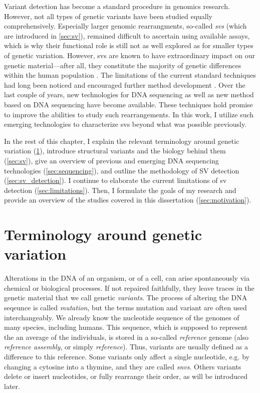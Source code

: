 Variant detection has become a standard procedure in genomics research. However,
not all types of genetic variants have been studied equally comprehensively.
Especially larger genomic rearrangments, so-called \emph{\aclp{sv}} (which are
introduced in \cref{sec:sv}), remained
difficult to ascertain using available assays, which is why their functional
role is still not as well explored as for smaller types of genetic variation.
However, \aclp{sv} are known to have extraordinary impact on our genetic
material---after all, they constitute the majority of genetic
differences within the human population \citep{Sudmant2015}.
The limitations of the current standard techniques had long been noticed and
encouraged further method development \citep{Onishi-Seebacher2011}. Over the
last couple of years, new technologies for DNA sequencing as well as new method
based on DNA sequencing have become available. These techniques hold promise to
improve the abilities to study such rearrangements. In this work, I utilize such
emerging technologies to characterize \aclp{sv} beyond what was possible previously.

In the rest of this chapter, I explain the relevant terminology around genetic
variation (\cref{sec:variation}), introduce structural variants and the biology
behind them (\cref{sec:sv}), give an overview of previous and emerging DNA
sequencing technologies (\cref{sec:sequencing}), and outline the methodology
of SV detection (\cref{sec:sv_detection}). I continue to elaborate the current
limitations of \acl{sv} detection (\cref{sec:limitations}). Then, I formulate
the goals of my research and provide an overview of the studies covered in this
dissertation (\cref{sec:motivation}).






\section{Terminology around genetic variation}
\label{sec:variation}

Alterations in the DNA of an organism, or of a cell, can arise spontaneously
via chemical or biological processes. If not repaired faithfully, they leave
traces in the genetic material that we call genetic \emph{variants}. The process
of altering the DNA seqeunce is called \emph{mutation}, but the terms mutation
and variant are often used interchangeably.
We already know the nucleotide sequence of the genomes of many species,
including humans. This sequence, which is supposed to represent the an average
of the individuals, is stored in a so-called \emph{reference} genome (also
\emph{reference assembly}, or simply \emph{reference}).
Thus, variants are usually defined as a difference to this reference. Some
variants only affect a single nucleotide, e.g. by changing a cytosine into a
thymine, and they are called \emph{\acfp{snv}}. Others variants delete or insert
nucleotides, or fully rearrange their order, as will be introduced later.

